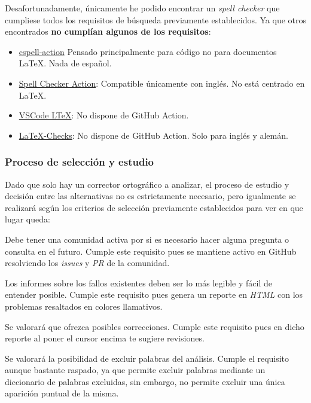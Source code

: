 Desafortunadamente, únicamente he podido encontrar un \emph{spell checker} que
cumpliese todos los requisitos de búsqueda previamente establecidos. Ya que otros
encontrados \textbf{no cumplían algunos de los requisitos}:
\begin{itemize}
    \item \href{https://github.com/marketplace/actions/cspell-action}{cspell-action} Pensado principalmente para código no para documentos LaTeX. Nada de español.
    \item \href{https://github.com/marketplace/actions/spell-checker-action}{Spell Checker Action}: Compatible únicamente con inglés. No está centrado en LaTeX. 
    \item \href{https://github.com/valentjn/vscode-ltex}{VSCode LTeX}: No dispone de GitHub Action.
    \item \href{https://github.com/erodner/latex-checks}{LaTeX-Checks}: No dispone de GitHub Action. Solo para inglés y alemán.
\end{itemize}

\subsubsection{Proceso de selección y estudio}
Dado que solo hay un corrector ortográfico a analizar, el proceso de estudio y
decisión entre las alternativas no es estrictamente necesario, pero igualmente
se realizará según los criterios de selección previamente establecidos para ver
en que lugar queda: 

\begin{todolist}
    \item[\xcmark] Debe tener una comunidad activa por si es necesario hacer
    alguna pregunta o consulta en el futuro. Cumple este requisito pues se
    mantiene activo en GitHub resolviendo los \emph{issues} y \emph{PR} de la
    comunidad.
    \item[\xcmark] Los informes sobre los fallos existentes deben ser lo más
    legible y fácil de entender posible. Cumple este requisito pues genera un
    reporte en \emph{HTML} con los problemas resaltados en colores llamativos.
    \item[\xcmark] Se valorará que ofrezca posibles correcciones. Cumple este
    requisito pues en dicho reporte al poner el cursor encima te sugiere
    revisiones.
    \item[\xcmark] Se valorará la posibilidad de excluir palabras del análisis.
    Cumple el requisito aunque bastante raspado, ya que permite excluir palabras
    mediante un diccionario de palabras excluidas, sin embargo, no permite
    excluir una única aparición puntual de la misma.
\end{todolist}

